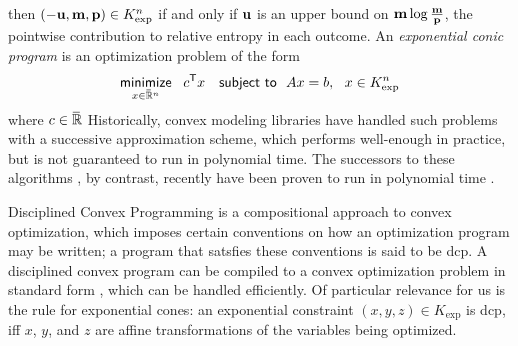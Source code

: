 \documentclass[twoside]{article}
\begin{document}
then $(-\mathbf{u}, \mathbf{m}, \mathbf{p}) \in K_{\exp}^n$ if and only if
$\mathbf{u}$ is an upper bound on $\mathbf{m} \log \frac{\mathbf{m}}{\mathbf{p}}$,
the pointwise contribution to relative entropy in each outcome.
%
An \emph{exponential conic program} is an optimization problem of the form
\[
    \mathop{\text{\sf minimize}}\limits_{x \in \mskip1mu\overline{\mskip-1mu\mathbb R\!}\,^n}~~ c^{\sf T} x
    \quad\text{\sf subject to}~~ Ax = b,~~x \in K_{\exp}^n
\]
where $c \in \mskip1mu\overline{\mskip-1mu\mathbb R\!}\,$
Historically, convex modeling libraries have handled such problems with a successive approximation scheme, which performs well-enough in practice, but is not guaranteed to run in polynomial time.
The successors to these algorithms \parencite{dahl2022primal}, by contrast, recently have been proven to run in polynomial time \parencite{badenbroek2021algorithm}.

Disciplined Convex Programming \parencite{dcp-thesis} is a
    compositional approach to convex optimization, which imposes certain conventions on how an optimization program may be written; a program that satsfies these conventions is said to be dcp.
A disciplined convex program can be compiled to a convex optimization problem in standard form \parencite{agrawal2018rewriting}, which can be handled efficiently.
Of particular relevance for us is the rule for
exponential cones: an exponential %
constraint $(x,y,z) \in K_{\exp}$ is dcp, iff $x$, $y$, and $z$ are affine transformations of the variables being optimized.

\end{document}
